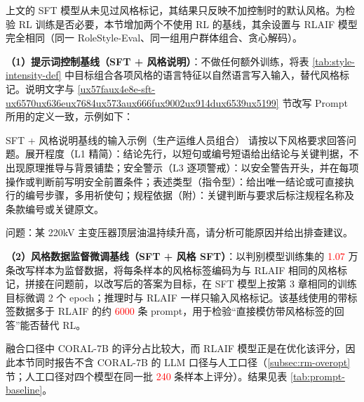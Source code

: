 \documentclass[fontset=fandol,type=master,campus=shenzhen,etitleauto=true]{hithesisbook}
\newcommand{\rev}[1]{\textcolor{red}{#1}}
\begin{document}
上文的 SFT 模型从未见过风格标记，其结果只反映不加控制时的默认风格。为检验 RL 训练是否必要，本节增加两个不使用 RL 的基线，其余设置与 RLAIF 模型完全相同（同一 RoleStyle-Eval、同一组用户群体组合、贪心解码）。

\textbf{（1）提示词控制基线（SFT + 风格说明）}：不做任何额外训练，将表 \ref{tab:style-intensity-def} 中目标组合各项风格的语言特征以自然语言写入输入，替代风格标记。说明文字与 \ref{ux57faux4e8e-sft-ux6570ux636eux7684ux573aux666fux9002ux914dux6539ux5199} 节改写 Prompt 所用的定义一致，示例如下：

\begin{promptbox}{SFT + 风格说明基线的输入示例（生产运维人员组合）}
请按以下风格要求回答问题。展开程度（L1 精简）：结论先行，以短句或编号短语给出结论与关键判据，不出现原理推导与背景铺垫；安全警示（L3 逐项警戒）：以安全警告开头，并在每项操作或判断前写明安全前置条件；表述类型（指令型）：给出唯一结论或可直接执行的编号步骤，多用祈使句；规程依据（附）：关键判断与要求后标注规程名称及条款编号或关键原文。\par\smallskip
问题：某 220kV 主变压器顶层油温持续升高，请分析可能原因并给出排查建议。
\end{promptbox}

\textbf{（2）风格数据监督微调基线（SFT + 风格 SFT）}：以判别模型训练集的 \rev{1.07} 万条改写样本为监督数据，将每条样本的风格标签编码为与 RLAIF 相同的风格标记，拼接在问题前，以改写后的答案为目标，在 SFT 模型上按第 3 章相同的训练目标微调 2 个 epoch；推理时与 RLAIF 一样只输入风格标记。该基线使用的带标签数据多于 RLAIF 的约 \rev{6000} 条 prompt，用于检验“直接模仿带风格标签的回答”能否替代 RL。

融合口径中 CORAL-7B 的评分占比较大，而 RLAIF 模型正是在优化该评分，因此本节同时报告不含 CORAL-7B 的 LLM 口径与人工口径（\ref{subsec:rm-overopt} 节；人工口径对四个模型在同一批 \rev{240} 条样本上评分）。结果见表 \ref{tab:prompt-baseline}。
\end{document}
